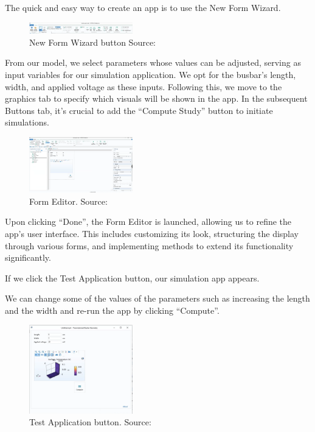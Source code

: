 The quick and easy way to create an app is to use the New Form Wizard.

\begin{figure}[ht!]
  \centering
  \includegraphics[width=0.4\textwidth]{Chapters/Figures/Chapter 3 Figures/New Form Wizard Button.png}
  \caption{New Form Wizard button Source: \cite{multiphysics__modeling_nodate}}
  \label{fig:New Form Wizard button}
\end{figure}

From our model, we select parameters whose values can be adjusted, serving as input variables for our simulation application. We opt for the busbar's length, width, and applied voltage as these inputs. Following this, we move to the graphics tab to specify which visuals will be shown in the app. In the subsequent Buttons tab, it's crucial to add the ``Compute Study'' button to initiate simulations.

\begin{figure}[ht!]
  \centering
  \includegraphics[width=0.4\textwidth]{Chapters/Figures/Chapter 3 Figures/Form Editor Desktop.png}
  \caption{Form Editor. Source: \cite{multiphysics__modeling_nodate}}
  \label{fig:Form Editor}
\end{figure}

Upon clicking ``Done'', the Form Editor is launched, allowing us to refine the app's user interface. This includes customizing its look, structuring the display through various forms, and implementing methods to extend its functionality significantly.

If we click the Test Application button, our simulation app appears.

We can change some of the values of the parameters such as increasing the length and the width and re-run the app by clicking ``Compute''.

\begin{figure}[ht!]
  \centering
  \includegraphics[width=0.4\textwidth]{Chapters/Figures/Chapter 3 Figures/Test Application Results.png}
  \caption{Test Application button. Source: \cite{multiphysics__modeling_nodate}}
  \label{fig:Test Application button.}
\end{figure}

